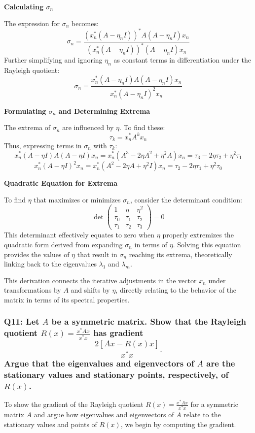 \documentclass[8pt]{article}
\begin{document}
{\textbf{Calculating \(\sigma_n\)}

The expression for \(\sigma_n\) becomes:
\[
\sigma_n = \frac{(x_n^* (A - \eta_n I))^* A (A - \eta_n I) x_n}{(x_n^* (A - \eta_n I))^* (A - \eta_n I) x_n}
\]
Further simplifying and ignoring \(\eta_n\) as constant terms in differentiation under the Rayleigh quotient:
\[
\sigma_n = \frac{x_n^* (A - \eta_n I) A (A - \eta_n I) x_n}{x_n^* (A - \eta_n I)^2 x_n}
\]

\textbf{Formulating \(\sigma_n\) and Determining Extrema}

The extrema of \(\sigma_n\) are influenced by \(\eta\). To find these:
\[
\tau_k = x_n^* A^k x_n
\]
Thus, expressing terms in \(\sigma_n\) with \(\tau_k\):
\[
x_n^* (A - \eta I) A (A - \eta I) x_n = x_n^* (A^3 - 2\eta A^2 + \eta^2 A) x_n = \tau_3 - 2\eta \tau_2 + \eta^2 \tau_1
\]
\[
x_n^* (A - \eta I)^2 x_n = x_n^* (A^2 - 2\eta A + \eta^2 I) x_n = \tau_2 - 2\eta \tau_1 + \eta^2 \tau_0
\]

\textbf{Quadratic Equation for Extrema}

To find \(\eta\) that maximizes or minimizes \(\sigma_n\), consider the determinant condition:
\[
\det \begin{pmatrix}
1 & \eta & \eta^2 \\
\tau_0 & \tau_1 & \tau_2 \\
\tau_1 & \tau_2 & \tau_3
\end{pmatrix} = 0
\]
This determinant effectively equates to zero when \(\eta\) properly extremizes the quadratic form derived from expanding \(\sigma_n\) in terms of \(\eta\). Solving this equation provides the values of \(\eta\) that result in \(\sigma_n\) reaching its extrema, theoretically linking back to the eigenvalues \(\lambda_1\) and \(\lambda_m\).

This derivation connects the iterative adjustments in the vector \(x_n\) under transformations by \(A\) and shifts by \(\eta\), directly relating to the behavior of the matrix in terms of its spectral properties.

\subsubsection*{Q11: Let \(A\) be a symmetric matrix. Show that the Rayleigh quotient \(R(x) = \frac{x^* A x}{x^* x}\) has gradient
\[
\frac{2[Ax - R(x)x]}{x^* x}.
\]
Argue that the eigenvalues and eigenvectors of \(A\) are the stationary values and stationary points, respectively, of \(R(x)\).}

To show the gradient of the Rayleigh quotient \( R(x) = \frac{x^* A x}{x^* x} \) for a symmetric matrix \(A\) and argue how eigenvalues and eigenvectors of \(A\) relate to the stationary values and points of \(R(x)\), we begin by computing the gradient.

}
\end{document}
